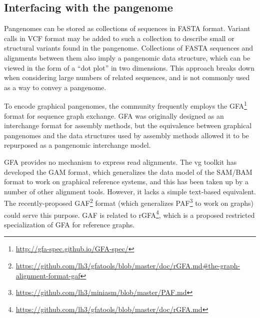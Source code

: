 


\subsection{Interfacing with the pangenome}

Pangenomes can be stored as collections of sequences in FASTA format.
Variant calls in VCF format may be added to such a collection to describe small or structural variants found in the pangenome.
Collections of FASTA sequences and alignments between them also imply a pangenomic data structure, which can be viewed in the form of a ``dot plot'' in two dimensions.
This approach breaks down when considering large numbers of related sequences, and is not commonly used as a way to convey a pangenome.

To encode graphical pangenomes, the community frequently employs the GFA\footnote{\url{http://gfa-spec.github.io/GFA-spec/}} format for sequence graph exchange.
GFA was originally designed as an interchange format for assembly methods, but the equivalence between graphical pangenomes and the data structures used by assembly methods allowed it to be repurposed as a pangenomic interchange model.

GFA provides no mechanism to express read alignments.
The vg toolkit has developed the GAM format, which generalizes the data model of the SAM/BAM format to work on graphical reference systems, and this has been taken up by a number of other alignment tools.
However, it lacks a simple text-based equivalent.
The recently-proposed GAF\footnote{\url{https://github.com/lh3/gfatools/blob/master/doc/rGFA.md#the-graph-alignment-format-gaf}} format (which generalizes PAF\footnote{\url{https://github.com/lh3/miniasm/blob/master/PAF.md}} to work on graphs) could serve this purpose.
GAF is related to rGFA\footnote{\url{https://github.com/lh3/gfatools/blob/master/doc/rGFA.md}}, which is a proposed restricted specialization of GFA for reference graphs.


